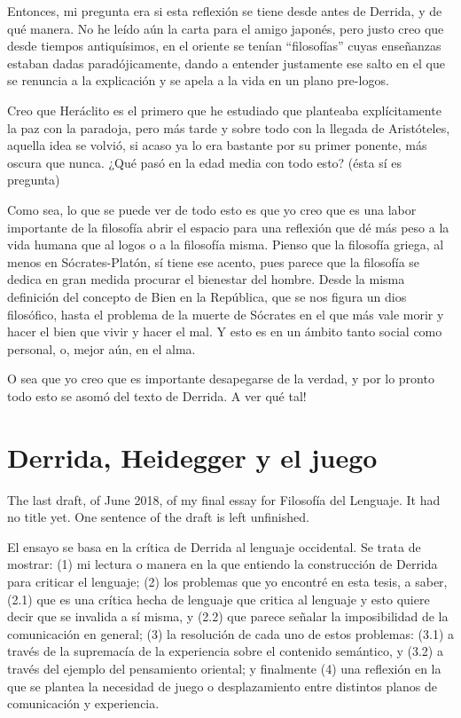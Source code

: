 Entonces, mi pregunta era si esta reflexión
se tiene desde antes de Derrida, y de qué
manera. No he leído aún la carta para el
amigo japonés, pero justo creo que desde
tiempos antiquísimos, en el oriente se tenían
``filosofías'' cuyas enseñanzas estaban dadas
paradójicamente, dando a entender justamente
ese salto en el que se renuncia a la
explicación y se apela a la vida en un plano
pre-logos.

Creo que Heráclito es el primero que he
estudiado que planteaba explícitamente la paz
con la paradoja, pero más tarde y sobre todo
con la llegada de Aristóteles, aquella idea
se volvió, si acaso ya lo era bastante por su
primer ponente, más oscura que nunca. ¿Qué
pasó en la edad media con todo esto? (ésta sí
es pregunta)

Como sea, lo que se puede ver de todo esto es
que yo creo que es una labor importante de la
filosofía abrir el espacio para una reflexión
que dé más peso a la vida humana que al logos
o a la filosofía misma. Pienso que la
filosofía griega, al menos en
Sócrates-Platón, sí tiene ese acento, pues
parece que la filosofía se dedica en gran
medida procurar el bienestar del hombre.
Desde la misma definición del concepto de
Bien en la República, que se nos figura un
dios filosófico, hasta el problema de la
muerte de Sócrates en el que más vale morir y
hacer el bien que vivir y hacer el mal. Y
esto es en un ámbito tanto social como
personal, o, mejor aún, en el alma.

O sea que yo creo que es importante
desapegarse de la verdad, y por lo pronto
todo esto se asomó del texto de Derrida. A
ver qué tal!

\section{Derrida, Heidegger y el juego}
\label{section-derrida-juego}

The last draft, of June 2018, of my final
essay for Filosofía del Lenguaje. It had no
title yet. One sentence of the draft is
left unfinished.

El ensayo se basa en la crítica de Derrida al
lenguaje occidental. Se trata de mostrar: (1)
mi lectura o manera en la que entiendo la
construcción de Derrida para criticar el
lenguaje; (2) los problemas que yo encontré
en esta tesis, a saber, (2.1) que es una
crítica hecha de lenguaje que critica al
lenguaje y esto quiere decir que se invalida
a sí misma, y (2.2) que parece señalar la
imposibilidad de la comunicación en general;
(3) la resolución de cada uno de estos
problemas: (3.1) a través de la supremacía de
la experiencia sobre el contenido semántico,
y (3.2) a través del ejemplo del pensamiento
oriental; y finalmente (4) una reflexión en
la que se plantea la necesidad de juego o
desplazamiento entre distintos planos de
comunicación y experiencia.

